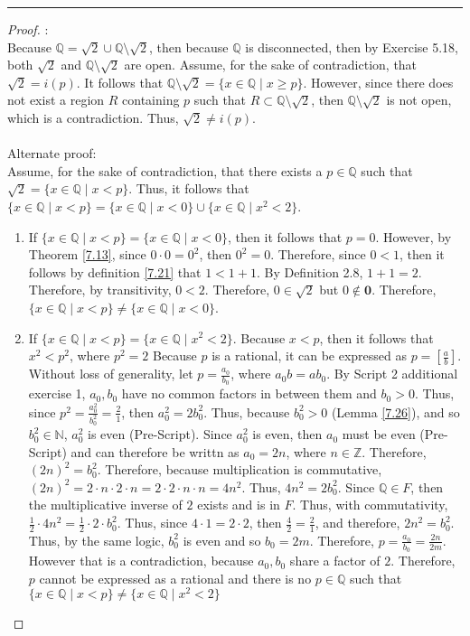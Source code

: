 \documentclass[openany, amssymb, psamsfonts]{amsart}
\newcommand{\bbN}{\mathbb{N}}
\newcommand{\bbQ}{\mathbb{Q}}
\newcommand{\bbZ}{\mathbb{Z}}
\newcommand{\sm}{\setminus}
\theoremstyle{definition}
\numberwithin{equation}{section}
\begin{document}
\begin{enumerate}
\begin{enumerate}
\vspace{4pt}     \hrule   \vspace{4pt}
\begin{proof}:\\
Because $\bbQ = \sqrt{2} \cup \bbQ \sm \sqrt{2}$, then because $\bbQ$ is disconnected, then by Exercise 5.18, both $\sqrt{2}$ and $\bbQ \sm \sqrt{2}$ are open. Assume, for the sake of contradiction, that $\sqrt{2}= i(p)$. It follows that $\bbQ \sm \sqrt{2} = \{x\in \bbQ \mid x\geq p\}$. However, since there does not exist a region $R$ containing $p$ such that $R\subset \bbQ \sm \sqrt{2}$, then $\bbQ \sm \sqrt{2}$ is not open, which is a contradiction. Thus, $\sqrt{2}\neq i(p)$. \\\\
Alternate proof:\\
Assume, for the sake of contradiction, that there exists a $p\in \bbQ$ such that $\sqrt{2} = \{x\in\bbQ\mid x<p\}$. Thus, it follows that $\{x\in\bbQ\mid x<p\} = \{x\in\bbQ\mid x< 0\}\cup\{x\in \bbQ\mid x^2<2\}$.
\begin{enumerate}
    \item If $\{x\in\bbQ \mid x<p\} = \{x\in \bbQ \mid x< 0\}$, then it follows that $p=0$. However, by Theorem \ref{7.13}, since $0\cdot 0 = 0^2$, then $0^2=0$. Therefore, since $0<1$, then it follows by definition \ref{7.21} that $1<1+1$. By Definition 2.8, $1+1 = 2$. Therefore, by transitivity, $0<2$. Therefore, $0\in \sqrt{2}$ but $0\notin \textbf{0}$. Therefore, $\{x\in\bbQ \mid x<p\} \neq \{x\in \bbQ \mid x< 0\}$.
    \item If $\{x\in\bbQ \mid x<p\} = \{x\in \bbQ\mid x^2<2\}$. Because $x<p$, then it follows that $x^2<p^2$, where $p^2 = 2$ Because $p$ is a rational, it can be expressed as $p=[\frac{a}{b}]$. Without loss of generality, let $p=\frac{a_0}{b_0}$, where $a_0b = ab_0$. By Script 2 additional exercise 1, $a_0, b_0$ have no common factors in between them and $b_0>0$. Thus, since $p^2 = \frac{a_0^2}{b_0^2} = \frac{2}{1}$, then $a_0^2 = 2b_0^2$. Thus, because $b_0^2>0$ (Lemma \ref{7.26}), and so $b_0^2 \in \bbN$, $a_0^2$ is even (Pre-Script). Since $a_0^2$ is even, then $a_0$ must be even (Pre-Script) and can therefore be writtn as $a_0 = 2n$, where $n\in \bbZ$. Therefore, $(2n)^2 = b_0^2$. Therefore, because multiplication is commutative, $(2n)^2 = 2\cdot n \cdot 2 \cdot n = 2\cdot 2 \cdot n \cdot n = 4n^2$. Thus, $4n^2 = 2b_0^2$. Since $\bbQ\in F$, then the multiplicative inverse of $2$ exists and is in $F$. Thus, with commutativity, $\frac{1}{2}\cdot 4n^2 = \frac{1}{2}\cdot 2 \cdot b_0^2$. Thus, since $4\cdot 1 = 2\cdot 2$, then $\frac{4}{2} = \frac{2}{1}$, and therefore, $2n^2 = b_0^2$. Thus, by the same logic, $b_0^2$ is even and so $b_0 = 2m$. Therefore, $p = \frac{a_0}{b_0} = \frac{2n}{2m}$. However that is a contradiction, because $a_0, b_0$ share a factor of $2$. Therefore, $p$ cannot be expressed as a rational and there is no $p\in \bbQ$ such that $\{x\in\bbQ \mid x<p\} \neq \{x\in \bbQ \mid x^2< 2\}$

\end{enumerate}
\end{proof}
\end{enumerate}
\end{enumerate}
\end{document}
